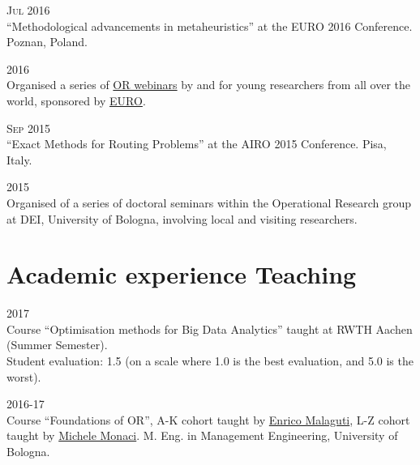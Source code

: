 \begin{paracol}{2}
  \textsc{Jul 2016}
\switchcolumn
  \\
  ``Methodological advancements in metaheuristics'' at the EURO 2016 Conference.
  Poznan, Poland.
\end{paracol}

\begin{paracol}{2}
    \textsc{2016}
\switchcolumn
  \\
  Organised a series of \href{http://santini.in/seminars}{OR webinars} by and for young researchers from all over the world, sponsored by \href{http://euro-online.org}{EURO}.
\end{paracol}

\begin{paracol}{2}
  \textsc{Sep 2015}
\switchcolumn
  \\
  ``Exact Methods for Routing Problems'' at the AIRO 2015 Conference.
  Pisa, Italy.
\end{paracol}

\begin{paracol}{2}
  \textsc{2015}
\switchcolumn
  \\
  Organised of a series of doctoral seminars within the Operational Research group at DEI, University of Bologna, involving local and visiting researchers.
\end{paracol}

\section*{Academic experience {\small Teaching}}

\begin{paracol}{2}
  \textsc{2017}
\switchcolumn
  \\
  Course ``Optimisation methods for Big Data Analytics'' taught at RWTH Aachen (Summer Semester).\\
  Student evaluation: 1.5 (on a scale where 1.0 is the best evaluation, and 5.0 is the worst).
\end{paracol}

\begin{paracol}{2}
  \textsc{2016-17}
\switchcolumn
  \\
  Course ``Foundations of OR'', A-K cohort taught by \href{https://scholar.google.com/citations?user=3nD4vYkAAAAJ}{Enrico Malaguti}, L-Z cohort taught by \href{https://scholar.google.com/citations?user=wORMYBMAAAAJ}{Michele Monaci}. M. Eng. in Management Engineering, University of Bologna.
\end{paracol}

